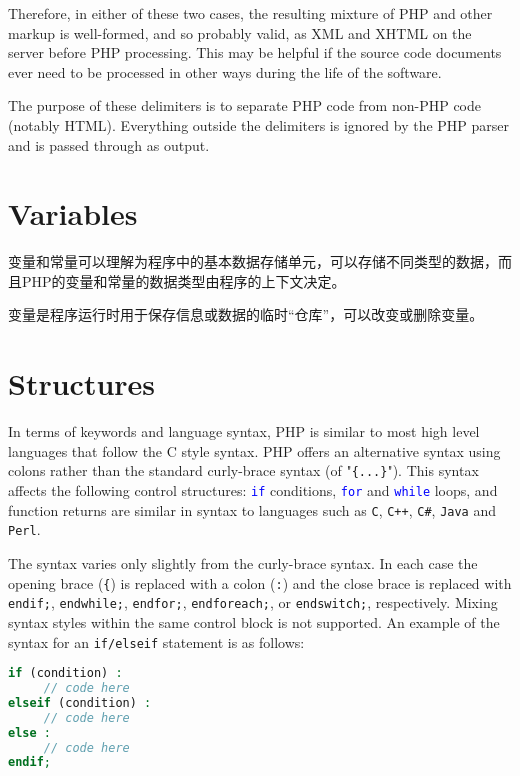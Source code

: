 Therefore, in either of these two cases, the resulting mixture of PHP and other markup is well-formed, and so probably valid, as XML and XHTML on the server before PHP processing. This may be helpful if the source code documents ever need to be processed in other ways during the life of the software.

The purpose of these delimiters is to separate PHP code from non-PHP code (notably HTML). Everything outside the delimiters is ignored by the PHP parser and is passed through as output.



\section{Variables}

变量和常量可以理解为程序中的基本数据存储单元，可以存储不同类型的数据，而且PHP的变量和常量的数据类型由程序的上下文决定。

变量是程序运行时用于保存信息或数据的临时“仓库”，可以改变或删除变量。




\section{Structures}




In terms of keywords and language syntax, PHP is similar to most high level languages that follow the C style syntax. PHP offers an alternative syntax using colons rather than the standard curly-brace syntax (of "\texttt{\{...\}}"). This syntax affects the following control structures: \texttt{\textcolor{Blue}{if}} conditions, \texttt{\textcolor{Blue}{for}} and \texttt{\textcolor{Blue}{while}} loops, and function returns are similar in syntax to languages such as \texttt{C}, \texttt{C++}, \texttt{C\#}, \texttt{Java} and \texttt{Perl}.

The syntax varies only slightly from the curly-brace syntax. In each case the opening brace (\texttt{\{}) is replaced with a colon (\texttt{:}) and the close brace is replaced with \texttt{endif;}, \texttt{endwhile;}, \texttt{endfor;}, \texttt{endforeach;}, or \texttt{endswitch;}, respectively. Mixing syntax styles within the same control block is not supported. An example of the syntax for an \texttt{if/elseif} statement is as follows:

\begin{lstlisting}[language=PHP]
if (condition) :
     // code here
elseif (condition) :
     // code here
else :
     // code here
endif;
\end{lstlisting}







